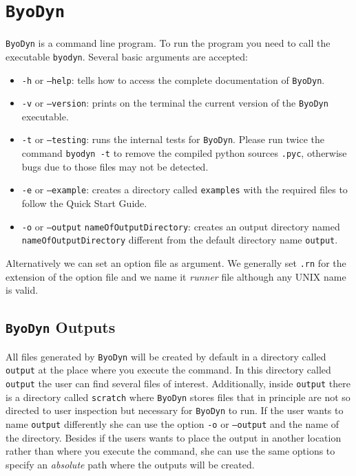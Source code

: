 \documentclass[a4paper, 11pt]{article}
\begin{document}
\section{\texttt{ByoDyn}}
\texttt{ByoDyn} is a command line program.
To run the program you need to call the executable \texttt{byodyn}.
Several basic arguments are accepted:
\begin{itemize}
\item \texttt{-h} or \texttt{--help}: 
  tells how to access the complete documentation of \texttt{ByoDyn}.
\item \texttt{-v} or \texttt{--version}:
  prints on the terminal the current version of the \texttt{ByoDyn} executable.
\item \texttt{-t} or \texttt{--testing}:
  runs the internal tests for \texttt{ByoDyn}.
  Please run twice the command \texttt{byodyn -t} to remove the compiled python sources \texttt{.pyc}, otherwise bugs due to those files may not be detected.
\item \texttt{-e} or \texttt{--example}:
  creates a directory called \texttt{examples} with the required files to follow the Quick Start Guide.
\item \texttt{-o} or \texttt{--output} \texttt{nameOfOutputDirectory}:
  creates an output directory named \texttt{nameOfOutputDirectory} different from the default directory name \texttt{output}.
\end{itemize}
Alternatively we can set an option file as argument.
We generally set \texttt{.rn} for the extension of the option file and we name it \emph{runner} file although any UNIX name is valid.
\subsection{\texttt{ByoDyn} Outputs} \label{byodynOutput}
All files generated by \texttt{ByoDyn} will be created by default in a directory called \texttt{output} at the place where you execute the command.
In this directory called \texttt{output} the user can find several files of interest.
Additionally, inside \texttt{output} there is a directory called \texttt{scratch} where \texttt{ByoDyn} stores files that in principle are not so directed to user inspection but necessary for \texttt{ByoDyn} to run.
If the user wants to name \texttt{output} differently she can use the option \texttt{-o} or \texttt{--output} and the name of the directory.
Besides if the users wants to place the output in another location rather than where you execute the command, she can use the same options to specify an \emph{absolute} path where the outputs will be created.
\end{document}
